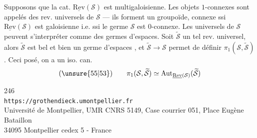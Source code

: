 Supposons   que la cat. $\underline{\mathrm{Rev}}(\mathcal S)$ est  multigaloisienne. Les objets $1$-connexes sont appelés des rev. universels de $\mathcal S$ ---  ils forment un groupoïde, connexe ssi $\underline{\mathrm{Rev}}(\mathcal S)$ est galoisienne i.e. ssi le germe $\mathcal S$ est $0$-connexe. Les  universels de $\mathcal S$ peuvent s'interpréter comme des germes d'espaces. Soit $\widetilde{\mathcal S}$ un tel rev. universel, alors $\widetilde{\mathcal S}$ est bel et bien un germe d'espaces , et $\widetilde{\mathcal S}\longrightarrow\mathcal S$ permet de définir $\pi_1(\mathcal S,\widetilde{\mathcal S})$. Ceci posé, on a un iso. can.
\[
(\unsure{55|53})\qquad \pi_1(\mathcal S,\widetilde{\mathcal S})\simeq\mathrm{Aut}_{\underline{\mathrm{Rev}}(\mathcal S)}(\widetilde{\mathcal S})
\]




\begin{center}
246\\
\texttt{https://grothendieck.umontpellier.fr}\\
Université de Montpellier, UMR CNRS 5149, Case courrier 051, Place Eugène Bataillon\\
34095 Montpellier cedex 5 - France
\end{center}
